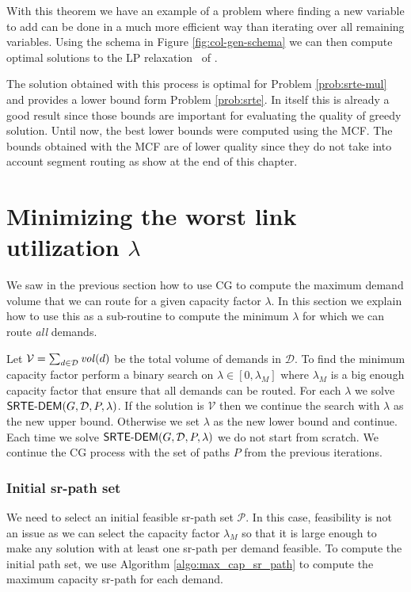 With this theorem we have an example of a problem where finding a new variable to add can be done in a much more efficient way
than iterating over all remaining variables. Using the schema in Figure \ref{fig:col-gen-schema} we can then compute optimal
solutions to the LP relaxation \srtepathlp~of \srtepathdem.

The solution obtained with this process is optimal for Problem \ref{prob:srte-mul} and provides a lower bound form Problem \ref{prob:srte}.
In itself this is already a good result since those bounds are important for evaluating the quality of greedy solution. Until now, the
best lower bounds were computed using the MCF. The bounds obtained with the MCF are of lower quality since they do not take into account
segment routing as show at the end of this chapter.

\section{Minimizing the worst link utilization $\lambda$}

We saw in the previous section how to use CG to compute the maximum demand volume that we can route for a given 
capacity factor $\lambda$. In this section we explain how to use this as a sub-routine to compute the
minimum $\lambda$ for which we can route \emph{all} demands.

Let $\mathcal{V} = \sum_{d \in \mathcal{D}} \mathit{vol}(d)$ be the total volume of demands in $\mathcal{D}$. To find the minimum
capacity factor perform a binary search on $\lambda \in [0, \lambda_M]$ where $\lambda_M$ is a big enough capacity factor
that ensure that all demands can be routed. For each $\lambda$ we solve $\textsf{SRTE-DEM}(G, \mathcal{D}, P, \lambda)$. If the
solution is $\mathcal{V}$ then we continue the search with $\lambda$ as the new upper bound. Otherwise we set $\lambda$
as the new lower bound and continue. Each time we solve $\textsf{SRTE-DEM}(G, \mathcal{D}, P, \lambda)$ we do not start from scratch. 
We continue the CG process with the set of paths $P$ from the previous iterations.

\subsubsection*{Initial sr-path set}

We need to select an initial feasible sr-path set $\mathcal{P}$. In this case, feasibility
is not an issue as we can select the capacity factor $\lambda_M$ so that it is large enough to make any solution with at least one sr-path per demand
feasible. To compute the initial path set, we use Algorithm \ref{algo:max_cap_sr_path} to compute the maximum capacity sr-path for each demand.


